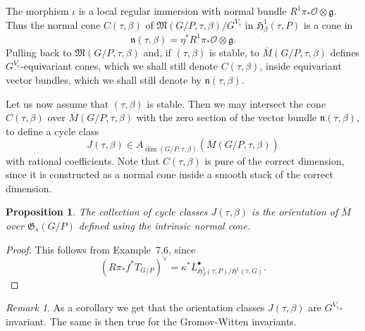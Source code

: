 \documentclass[11pt]{article}
\newcommand{\GG}{\mathfrak{G}}
\newcommand{\Gg}{\mathfrak{g}}
\newcommand{\HH}{\mathfrak{H}}
\newcommand{\MM}{\mathfrak{M}}
\newcommand{\Nn}{\mathfrak{n}}
\renewcommand{\O}{\mathcal{O}}
\newcommand{\com}{^{\scriptscriptstyle\bullet}}
\newcommand{\dual}[1]{{{#1}^{\vee}}}
\newcommand{\lst}{_{\ast}}
\newcommand{\ol}{\overline}
\renewcommand{\tilde}{\widetilde}
\newcommand{\upst}{^{\ast}}
\theoremstyle{plain}
\newtheorem{prop}{Proposition}
\theoremstyle{remark}
\newtheorem*{rmk}{Remark}
\newenvironment{pf}{\begin{proof}}{\end{proof}}
\theoremstyle{plain}
\theoremstyle{definition}
\theoremstyle{remark}
\begin{document}
The morphism \(\iota\) is a local regular immersion with normal bundle
\(R^1\pi\lst\O\otimes\Gg\).  Thus the normal cone \(C(\tau,\beta)\) of
\(\MM(G/P,\tau,\beta)/G^{V_{\tilde{\tau}}}\) in
\(\HH^1_{\beta}(\tau,P)\) is a cone in
\[
\Nn(\tau,\beta)=\eta\upst R^1\pi\lst\O\otimes\Gg.
\]
Pulling back to \(\MM(G/P,\tau,\beta)\) and, if \((\tau,\beta)\) is
stable, to \(\ol{M}(G/P,\tau,\beta)\) defines
\(G^{V_{\tilde{\tau}}}\)-equivariant cones, which we shall still
denote \(C(\tau,\beta)\), inside equivariant vector bundles, which we
shall still denote by \(\Nn(\tau,\beta)\).

Let us now assume that \((\tau,\beta)\) is stable. Then we may intersect
the cone \(C(\tau,\beta)\) over \(\ol{M}(G/P,\tau,\beta)\) with the zero
section of the vector bundle \(\Nn(\tau,\beta)\), to define a cycle
class
\[
J(\tau,\beta)\in A_{\dim(G/P,\tau,\beta)}(\ol{M}(G/P,\tau,\beta))
\]
with rational coefficients. Note that \(C(\tau,\beta)\) is pure of the
correct dimension, since it is constructed as a normal cone inside a
smooth stack of the correct dimension.

\begin{prop} \label{tmt}
The collection of cycle classes \(J(\tau,\beta)\) is the orientation of
\(\ol{M}\) over \(\GG_s(G/P)\) defined using the intrinsic normal cone.
\end{prop}
\begin{pf}
This follows from \cite{BF} Example~7.6, since
\[
\dual{(R\pi\lst f\upst T_{G/P})}=\kappa\upst
L\com_{\HH^1_{\beta}(\tau,P)/\HH^1(\tau,G)}.
\]
\end{pf}

\begin{rmk}
As a corollary we get that the orientation classes \(J(\tau,\beta)\) are
\(G^{V_{\tilde{\tau}}}\)-invariant. The same is then true for the
Gromov-Witten invariants.
\end{rmk}


%
%
\end{document}
